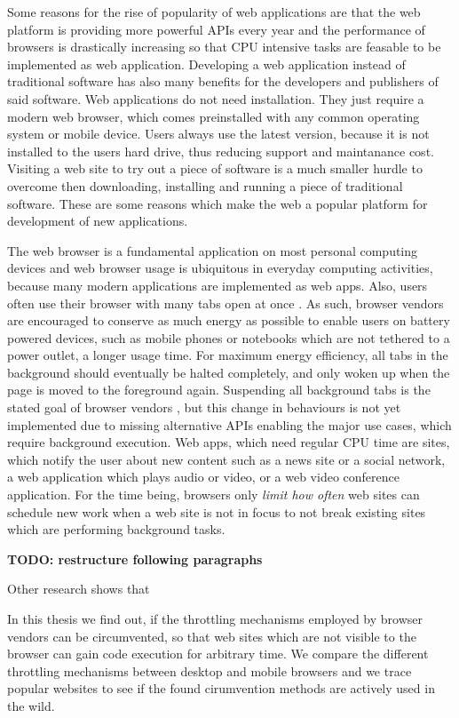 \documentclass[
	ruledheaders=section,%
	class=report,%
	thesis={type=bachelor},%
	accentcolor=9c,%
	custommargins=true,%
	marginpar=false,%
	parskip=half-,%
	fontsize=11pt,%
]{tudapub}
\begin{document}
Some reasons for the rise of popularity of web applications are that the web platform is providing more powerful APIs every year and the performance of browsers is drastically increasing so that CPU intensive tasks are feasable to be implemented as web application. Developing a web application instead of traditional software has also many benefits for the developers and publishers of said software. Web applications do not need installation. They just require a modern web browser, which comes preinstalled with any common operating system or mobile device. Users always use the latest version, because it is not installed to the users hard drive, thus reducing support and maintanance cost. Visiting a web site to try out a piece of software is a much smaller hurdle to overcome then downloading, installing and running a piece of traditional software. These are some reasons which make the web a popular platform for development of new applications.

The web browser is a fundamental application on most personal computing devices and web browser usage is ubiquitous in everyday computing activities, because many modern applications are implemented as web apps. Also, users often use their browser with many tabs open at once \cite{weinreich2008not}. As such, browser vendors are encouraged to conserve as much energy as possible to enable users on battery powered devices, such as mobile phones or notebooks which are not tethered to a power outlet, a longer usage time. For maximum energy efficiency, all tabs in the background should eventually be halted completely, and only woken up when the page is moved to the foreground again. Suspending all background tabs is the stated goal of browser vendors \cite{chrome-background-tabs-roadmap}, but this change in behaviours is not yet implemented due to missing alternative APIs enabling the major use cases, which require background execution. Web apps, which need regular CPU time are sites, which notify the user about new content such as a news site or a social network, a web application which plays audio or video, or a web video conference application. For the time being, browsers only \textit{limit how often} web sites can schedule new work when a web site is not in focus to not break existing sites which are performing background tasks.

\textbf{TODO: restructure following paragraphs}

  Other research shows that


  In this thesis we find out, if the throttling mechanisms employed by browser vendors can be circumvented, so that web sites which are not visible to the browser can gain code execution for arbitrary time. We compare the different throttling mechanisms between desktop and mobile browsers and we trace popular websites to see if the found cirumvention methods are actively used in the wild.
\end{document}

